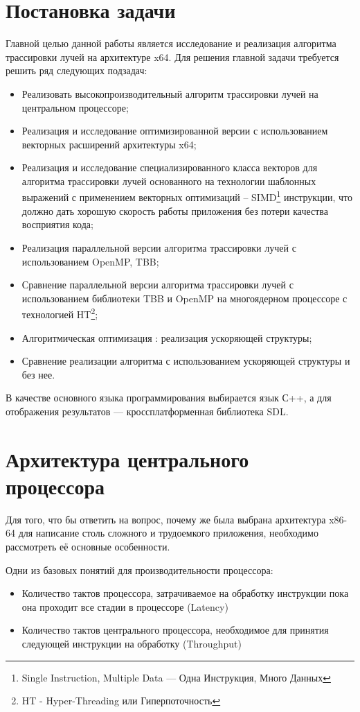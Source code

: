 \documentclass[12pt, a4paper, utf8]{article}
\begin{document}
\newpage 
\section{Постановка задачи}
Главной целью данной работы является исследование и реализация алгоритма трассировки лучей на архитектуре x64. Для решения главной задачи требуется решить ряд следующих подзадач:
\begin{itemize}
	\item Реализовать высокопроизводительный алгоритм трассировки лучей на центральном процессоре;
	\item Реализация и исследование оптимизированной версии с использованием векторных расширений архитектуры x64;
	\item Реализация и исследование специализированного класса векторов для алгоритма трассировки лучей основанного на технологии шаблонных выражений с применением векторных оптимизаций -- SIMD\footnote{ Single Instruction, Multiple Data — Одна Инструкция, Много Данных } инструкции, что должно дать хорошую скорость работы приложения без потери качества восприятия кода;
	\item Реализация параллельной версии алгоритма трассировки лучей с использованием OpenMP, TBB;
	\item Сравнение параллельной версии алгоритма трассировки лучей с использованием библиотеки TBB и OpenMP на многоядерном процессоре с технологией HT\footnote{HT - Hyper-Threading или Гиперпоточность };
	\item Алгоритмическая оптимизация : реализация ускоряющей структуры;
	\item Сравнение реализации алгоритма с использованием ускоряющей структуры и без нее.
\end{itemize}
   В качестве основного языка программирования выбирается язык С++, а для отображения результатов — кроссплатформенная библиотека SDL. 
   
\newpage 
\section{Архитектура центрального процессора}

Для того, что бы ответить на вопрос, почему же была выбрана архитектура x86-64 для написание столь сложного и трудоемкого приложения, необходимо рассмотреть её основные особенности.

Одни из базовых понятий для производительности процессора:
\begin{itemize}
\item Количество тактов процессора, затрачиваемое на обработку инструкции пока она проходит все стадии в процессоре (Latency)
\item Количество тактов центрального процессора, необходимое для принятия следующей инструкции на обработку (Throughput)
\end{itemize}
\end{document}
